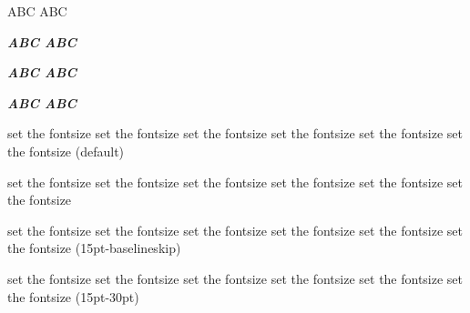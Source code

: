             ABC ABC

            {\sffamily\large\bfseries\itshape ABC \normalfont ABC}
            
            {\sffamily\large\bfseries\itshape ABC \normalsize ABC}
            
            {\sffamily\large\bfseries\itshape ABC \normalsize\normalfont ABC}

            set the fontsize set the fontsize set the fontsize set the fontsize set the fontsize set the fontsize (default)

            \fontsize{15pt}{\baselineskip}
            {
                \selectfont set the fontsize set the fontsize set the fontsize set the fontsize set the fontsize set the fontsize
        
                set the fontsize set the fontsize set the fontsize set the fontsize set the fontsize set the fontsize (15pt-baselineskip)

            }

            \fontsize{15}{30}
            {
                \selectfont set the fontsize set the fontsize set the fontsize set the fontsize set the fontsize set the fontsize (15pt-30pt)\par

            }

